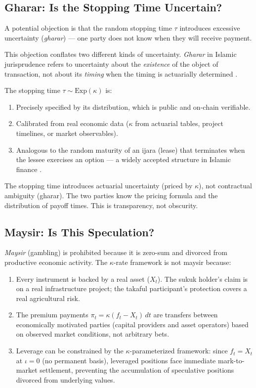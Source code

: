 \documentclass[10pt,twocolumn]{article}
\theoremstyle{plain}
\theoremstyle{definition}
\begin{document}
\subsection{Gharar: Is the Stopping Time Uncertain?}

A potential objection is that the random stopping time $\tau$
introduces excessive uncertainty (\textit{gharar}) --- one party
does not know when they will receive payment.

This objection conflates two different kinds of uncertainty.
\textit{Gharar} in Islamic jurisprudence refers to uncertainty
about the \textit{existence} of the object of transaction, not
about its \textit{timing} when the timing is actuarially
determined \cite{ElGamal2006,Kamali2007}.

The stopping time $\tau \sim \mathrm{Exp}(\kappa)$ is:
\begin{enumerate}[leftmargin=*,noitemsep]
\item Precisely specified by its distribution, which is public
and on-chain verifiable.
\item Calibrated from real economic data ($\kappa$ from actuarial
tables, project timelines, or market observables).
\item Analogous to the random maturity of an ijara (lease) that
terminates when the lessee exercises an option --- a widely
accepted structure in Islamic finance \cite{AAOIFI2017}.
\end{enumerate}
The stopping time introduces actuarial uncertainty (priced by
$\kappa$), not contractual ambiguity (gharar). The two parties
know the pricing formula and the distribution of payoff times.
This is transparency, not obscurity.

\subsection{Maysir: Is This Speculation?}

\textit{Maysir} (gambling) is prohibited because it is zero-sum
and divorced from productive economic activity. The $\kappa$-rate
framework is not maysir because:
\begin{enumerate}[leftmargin=*,noitemsep]
\item Every instrument is backed by a real asset ($X_t$).
The sukuk holder's claim is on a real infrastructure project;
the takaful participant's protection covers a real agricultural
risk.
\item The premium payments $\pi_t = \kappa(f_t - X_t)\,dt$ are
transfers between economically motivated parties (capital
providers and asset operators) based on observed market
conditions, not arbitrary bets.
\item Leverage can be constrained by the $\kappa$-parameterized
framework: since $f_t = X_t$ at $\iota = 0$ (no permanent
basis), leveraged positions face immediate mark-to-market
settlement, preventing the accumulation of speculative positions
divorced from underlying values.
\end{enumerate}
\end{document}
